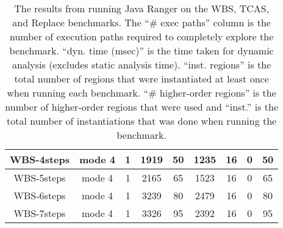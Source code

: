 \begin{table}[]
\begin{tabular}{@{}ccccccccc@{}}
        WBS-4steps                                                  & mode 4                                                       & 1                                                          & 1919                                                         & 50                                                             & 1235                                                                   & 16                                                            & 0                                                                      & 50       \\ \midrule
        WBS-5steps                                                  & mode 4                                                       & 1                                                          & 2165                                                         & 65                                                             & 1523                                                                   & 16                                                            & 0                                                                      & 65       \\ \midrule
        WBS-6steps                                                  & mode 4                                                       & 1                                                          & 3239                                                         & 80                                                             & 2479                                                                   & 16                                                            & 0                                                                      & 80       \\ \midrule
        WBS-7steps                                                  & mode 4                                                       & 1                                                          & 3326                                                         & 95                                                             & 2392                                                                   & 16                                                            & 0                                                                      & 95       \\ \bottomrule
    \end{tabular}
    \caption{The results from running Java Ranger on the WBS, TCAS, and Replace benchmarks. The ``\# exec paths'' column
    is the number of execution paths required to completely explore the benchmark. ``dyn. time (msec)'' is the time taken
    for dynamic analysis (excludes static analysis time). ``inst. regions'' is the total number of regions that were
    instantiated at least once when running each benchmark. ``\# higher-order regions'' is the number of higher-order regions
    that were used and ``inst.'' is the total number of instantiations that was done when running the benchmark.}
    \label{table:results}
\end{table}